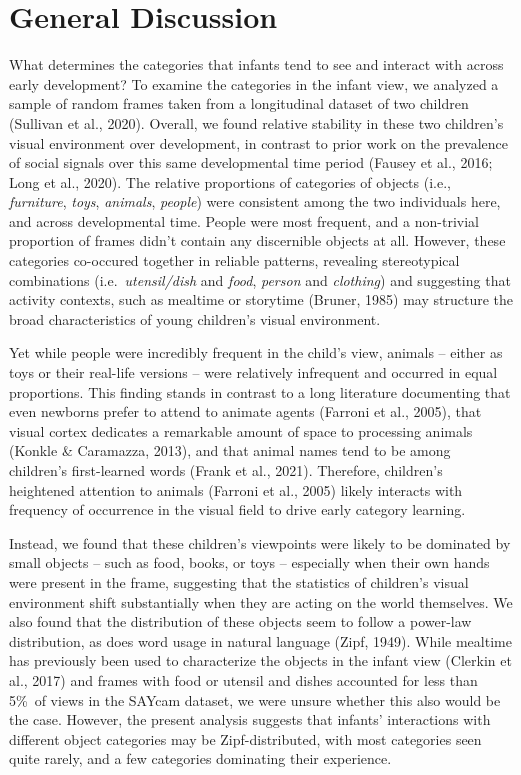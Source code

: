 \documentclass[10pt, letterpaper]{article}
\begin{document}
\hypertarget{general-discussion}{%
\section{General Discussion}\label{general-discussion}}

What determines the categories that infants tend to see and interact
with across early development? To examine the categories in the infant
view, we analyzed a sample of random frames taken from a longitudinal
dataset of two children (Sullivan et al., 2020). Overall, we found
relative stability in these two children's visual environment over
development, in contrast to prior work on the prevalence of social
signals over this same developmental time period (Fausey et al., 2016;
Long et al., 2020). The relative proportions of categories of objects
(i.e., \emph{furniture}, \emph{toys}, \emph{animals}, \emph{people})
were consistent among the two individuals here, and across developmental
time. People were most frequent, and a non-trivial proportion of frames
didn't contain any discernible objects at all. However, these categories
co-occured together in reliable patterns, revealing stereotypical
combinations (i.e.~\emph{utensil/dish} and \emph{food}, \emph{person}
and \emph{clothing}) and suggesting that activity contexts, such as
mealtime or storytime (Bruner, 1985) may structure the broad
characteristics of young children's visual environment.

Yet while people were incredibly frequent in the child's view, animals
-- either as toys or their real-life versions -- were relatively
infrequent and occurred in equal proportions. This finding stands in
contrast to a long literature documenting that even newborns prefer to
attend to animate agents (Farroni et al., 2005), that visual cortex
dedicates a remarkable amount of space to processing animals (Konkle \&
Caramazza, 2013), and that animal names tend to be among children's
first-learned words (Frank et al., 2021). Therefore, children's
heightened attention to animals (Farroni et al., 2005) likely interacts
with frequency of occurrence in the visual field to drive early category
learning.

Instead, we found that these children's viewpoints were likely to be
dominated by small objects -- such as food, books, or toys -- especially
when their own hands were present in the frame, suggesting that the
statistics of children's visual environment shift substantially when
they are acting on the world themselves. We also found that the
distribution of these objects seem to follow a power-law distribution,
as does word usage in natural language (Zipf, 1949). While mealtime has
previously been used to characterize the objects in the infant view
(Clerkin et al., 2017) and frames with food or utensil and dishes
accounted for less than 5\%~of views in the SAYcam dataset, we were
unsure whether this also would be the case. However, the present
analysis suggests that infants' interactions with different object
categories may be Zipf-distributed, with most categories seen quite
rarely, and a few categories dominating their experience.
\end{document}
